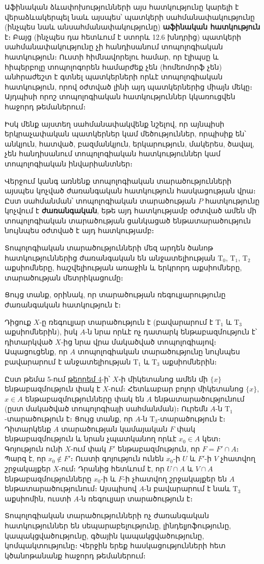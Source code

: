 \documentclass[./main.tex]{subfiles}
\begin{document}
\par Աֆինական ձևափոխությունների այս հատկությունը կարելի է վերաձևակեր\-պել նաև այսպես՝ պատկերի սահմանափակությունը (ինչպես նաև ան\-սահ\-մա\-նա\-փա\-կությունը) \textbf{աֆինական հատկություն} է։ Բայց (ինչպես դա հետևում է ստորև 12.6 խնդրից) պատկերի սահմանափակությունը չի հանդիսանում տոպոլոգիական հատ\-կություն։ Ուստի հիմնավորելու համար, որ էլիպսը և հիպերբոլը տոպոլոգորեն համ\-ար\-ժեք չեն (հոմեոմորֆ չեն) անհրաժեշտ է գտնել պատկերների որևէ տո\-պո\-լո\-գի\-ա\-կան հատկություն, որով օժտված լինի այդ պատկերներից միայն մեկը։ Այդպիսի որոշ տո\-պո\-լո\-գիական հատկություններ կկառուցվեն հաջորդ թեմաներում։

\par Իսկ մենք այստեղ սահմանափակվենք նշելով, որ այնպիսի երկրաչափական պատկերներ կամ մեծություններ, որպիսիք են՝ անկյուն, հատված, բազմանկյուն, երկարություն, մակերես, ծավալ, չեն հանդիսանում տոպոլոգիական հատկություն\-ներ կամ տոպոլոգիական ինվարիանտներ։

\par Վերջում կանգ առնենք տոպոլոգիական տարածությունների այսպես կոչված ժառանգական հատկություն հասկացության վրա։ Ըստ սահմանման՝ տոպո\-լո\-գիա\-կան տարածության $P$ հատկությունը կոչվում է \textbf{ժառանգական}, եթե այդ հատկու\-թյամբ օժտված ամեն մի տոպոլոգիական տարածության ցանկացած ենթատարա\-ծու\-թյուն նույնպես օժտված է այդ հատկությամբ։

\par Տոպոլոգիական տարածությունների մեզ արդեն ծանոթ հատկություններից ժա\-ռան\-գական են անջատելիության $\textrm{T}_0$, $\textrm{T}_1$, $\textrm{T}_2$ աքսիոմները, հաշվելիության առաջին և երկրորդ
աքսիոմները, տարածության մետրիկացումը։

\par Ցույց տանք, օրինակ, որ տարածության ռեգուլյարությունը ժառանգական հատ\-կություն է։

\par Դիցուք $X$-ը ռեգուլյար տարածություն է (բավարարում է $\textrm{T}_1$ և $\textrm{T}_3$ աքսիոմներին), իսկ $A$-ն նրա որևէ ոչ դատարկ ենթաբազմություն է՝ դիտարկված $X$-ից նրա վրա մակածված տոպոլոգիայով։ Ապացուցենք, որ $A$ տոպոլոգիական տարածությունը նույնպես բավարարում է անջատելիության $\textrm{T}_1$ և $\textrm{T}_3$ աքսիոմներին։

\par Ըստ թեմա 5-ում \hyperref[ch5thm4]{թեորեմ 4}-ի՝ $X$֊ի միկետանոց ամեն մի $\{x\}$ ենթաբազմություն փակ է $X$-ում։ Հետևաբար բոլոր միկետանոց $\{x\}$, $x\in A$ ենթաբազմությունները փակ են $A$ ենթատարածությունում (ըստ մակածված տոպոլոգիայի սահմանման)։ Ուրեմն $A$-ն $\textrm{T}_1$-տարածություն է։ Ցույց տանք, որ $A$-ն $\textrm{T}_3$-տարածություն է։ Դիտար\-կենք $A$ տարածության կամայական $F$ փակ ենթաբազմություն և նրան չպատկանող որևէ $x_0 \in A$ կետ։ Գոյություն ունի $X$-ում փակ $F'$ ենթաբազմություն, որ $F = F' \cap A$։ Պարզ է, որ $x_0 \notin F'$։ Ուստի գոյություն ունեն $x_0$-ի $U$ և $F'$-ի $V$ չհատվող շրջակայքեր $X$-ում։ Դրանից հետևում է, որ $U \cap A$ և $V \cap A$ ենթաբազմությունները $x_0$-ի և $F$-ի չհատ\-վող շրջակայքեր են $A$ ենթատարածությունում։ Այսպիսով $A$-ն բավարարում է նաև $\textrm{T}_3$ աքսիոմին, ուստի $A$-ն ռեգուլյար տարածություն է։

\par Տոպոլոգիական տարածությունների ոչ ժառանգական հատկություններ են սե\-պա\-րաբելությունը, լինդելյոֆությունը, կապակցվածությունը, գծային կապակց\-վա\-ծու\-թյու\-նը, կոմ\-պակտությունը։ Վերջին երեք հասկացությունների հետ կծանո\-թա\-նանք հաջորդ թե\-մա\-նե\-րում։


\end{document}

